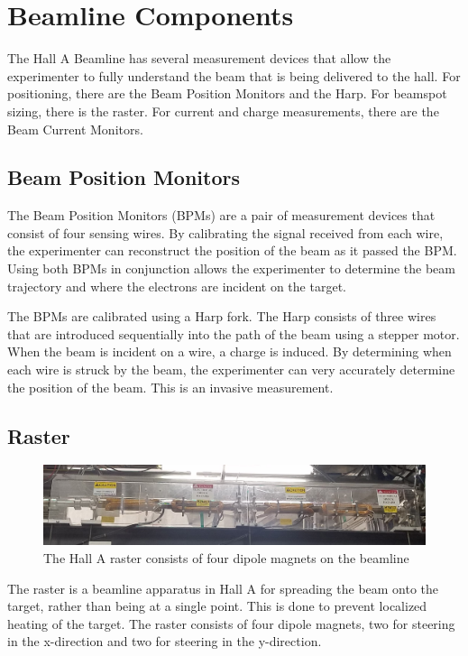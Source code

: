 \section{Beamline Components}

The Hall A Beamline has several measurement devices that allow the experimenter to fully understand the beam that is being delivered to the hall. For positioning, there are the Beam Position Monitors and the Harp. For beamspot sizing, there is the raster. For current and charge measurements, there are the Beam Current Monitors.

\subsection{Beam Position Monitors}

The Beam Position Monitors (BPMs) are a pair of measurement devices that consist of four sensing wires. By calibrating the signal received from each wire, the experimenter can reconstruct the position of the beam as it passed the BPM. Using both BPMs in conjunction allows the experimenter to determine the beam trajectory and where the electrons are incident on the target.

The BPMs are calibrated using a Harp fork. The Harp consists of three wires that are introduced sequentially into the path of the beam using a stepper motor. When the beam is incident on a wire, a charge is induced. By determining when each wire is struck by the beam, the experimenter can very accurately determine the position of the beam. This is an invasive measurement.

\subsection{Raster}
\begin{figure}
	\includegraphics[width=\linewidth]{./chap2-exp/fig/raster_pic.jpg}
	\caption{The Hall A raster consists of four dipole magnets on the beamline}
	\label{fig:rasterpic}
\end{figure}

The raster is a beamline apparatus in Hall A for spreading the beam onto the target, rather than being at a single point. This is done to prevent localized heating of the target. The raster consists of four dipole magnets, two for steering in the x-direction and two for steering in the y-direction.

